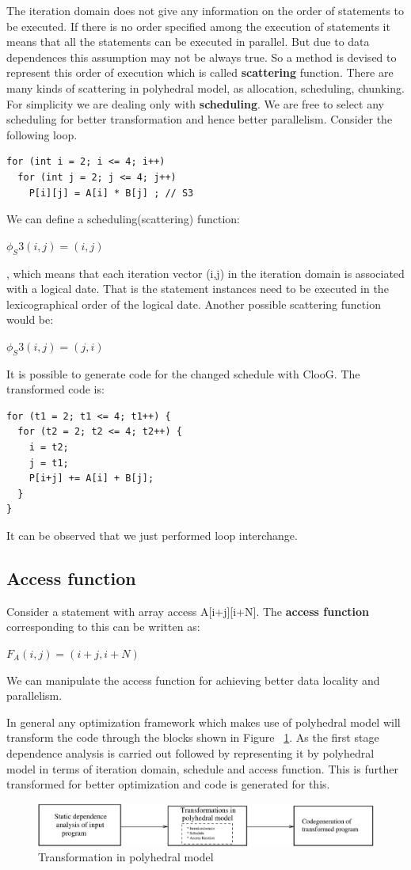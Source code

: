 The iteration domain does not give any information on the order of statements to be executed. If there
is no order specified among the execution of statements it means that all the statements can be executed
in parallel. But due to data dependences this assumption may not be always true. So a method is devised
to represent this order of execution which is called \textbf{scattering} function. There are many
kinds of scattering in polyhedral model, as allocation, scheduling, chunking. For simplicity
we are dealing only with \textbf{scheduling}. We are free to select any scheduling for better
transformation and hence better parallelism.
Consider the following loop.
{\footnotesize
\begin{lstlisting}
for (int i = 2; i <= 4; i++)
  for (int j = 2; j <= 4; j++)
    P[i][j] = A[i] * B[j] ; // S3
\end{lstlisting}
}
\noindent
We can define a scheduling(scattering) function:
\begin{center}
$\phi_S3(i,j) = (i,j)$
\end{center}, which means that each iteration vector (i,j) in the iteration domain is associated with
a logical date. That is the statement instances need to be executed in the lexicographical order of the
logical date. Another possible scattering function would be:
\begin{center}
$\phi_S3(i,j) = (j,i)$
\end{center}
\noindent
It is possible to generate code for the changed schedule with ClooG\cite{cloog}. The
transformed code is:
{\footnotesize
\begin{lstlisting}
for (t1 = 2; t1 <= 4; t1++) {
  for (t2 = 2; t2 <= 4; t2++) {
    i = t2;
    j = t1;
    P[i+j] += A[i] + B[j];
  }
}
\end{lstlisting}
}
\noindent
It can be observed that we just performed loop interchange.
\subsection{Access function}
Consider a statement with array access A[i+j][i+N]. The \textbf{access function} corresponding to this can be written
as:
\begin{center}
$F_A(i,j) = (i+j,i+N)$
\end{center}
We can manipulate the access function for achieving better data locality and parallelism.

In general any optimization framework which makes use of polyhedral model will
transform the code through the blocks shown in Figure ~\ref{fig:poly_steps}.
As the first stage dependence analysis is carried out followed by representing
it by polyhedral model in terms of iteration domain, schedule and access function.
This is further transformed for better optimization and code is generated
for this.
\begin{figure}
  \includegraphics[width=1\textwidth]{images/poly_steps.eps}
  \caption{Transformation in polyhedral model}
  \label{fig:poly_steps}
\end{figure}
